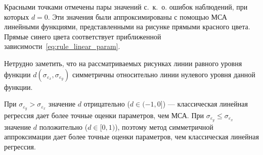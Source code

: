 Красными точками отмечены пары значений с.~к.~о. ошибок наблюдений, при которых \( d = 0 \).
Эти значения были аппроксимированы с помощью МСА линейными функциями,
представленными на рисунке прямыми красного цвета.
Прямые синего цвета соответствует приближенной зависимости~\eqref{eq:rule_linear_param}.

Нетрудно заметить, что на рассматриваемых рисунках линии равного уровня функции
\( d(\sigma_{\varepsilon_x}, \sigma_{\varepsilon_y}) \)
симметричны относительно линии нулевого уровня данной функции.

При \( \sigma_{\varepsilon_y} > \sigma_{\varepsilon_x} \)
значение \( d \) отрицательно (\( d \in ( -1, 0 ] \)) ---
классическая линейная регрессия дает более точные оценки параметров, чем МСА.
При \( \sigma_{\varepsilon_y} \le \sigma_{\varepsilon_x} \)
значение \( d \) положительно (\( d \in [0, 1 ) \)),
поэтому метод симметричной аппроксимации дает более точные оценки параметров,
чем классическая линейная регрессия.

